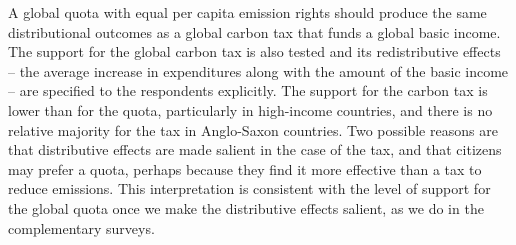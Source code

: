 A global quota with equal per capita emission rights should produce the same distributional outcomes as a global carbon tax that funds a global basic income. %
The support for the global carbon tax is also tested and its redistributive effects --  the average increase in expenditures along with the amount of the basic income -- are specified to the respondents explicitly. %
The support for the carbon tax is lower than for the quota, particularly in high-income countries, and there is no relative majority for the tax in Anglo-Saxon countries. %
Two possible reasons %
are that distributive effects are made salient in the case of the tax, and that citizens may prefer a quota, perhaps because they find it more effective than a tax to reduce emissions. This interpretation is consistent with the level of support for the global quota once we make the distributive effects salient, as we do in the complementary surveys.



